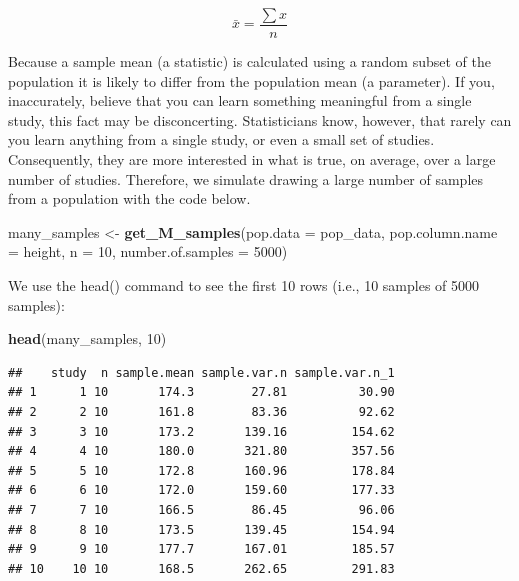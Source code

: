 \documentclass[
]{krantz}
\makeatletter
\newenvironment{Shaded}{\begin{snugshade}}{\end{snugshade}}
\newcommand{\DataTypeTok}[1]{\textcolor[rgb]{0.27,0.27,0.27}{#1}}
\newcommand{\DecValTok}[1]{\textcolor[rgb]{0.06,0.06,0.06}{#1}}
\newcommand{\KeywordTok}[1]{\textcolor[rgb]{0.27,0.27,0.27}{\textbf{#1}}}
\newcommand{\NormalTok}[1]{#1}
\newcommand{\StringTok}[1]{\textcolor[rgb]{0.5,0.5,0.5}{#1}}
\newenvironment{kframe}{%
\medskip{}
\setlength{\fboxsep}{.8em}
 \def\at@end@of@kframe{}%
 \ifinner\ifhmode%
  \def\at@end@of@kframe{\end{minipage}}%
  \begin{minipage}{\columnwidth}%
 \fi\fi%
 \def\FrameCommand##1{\hskip\@totalleftmargin \hskip-\fboxsep
 \colorbox{shadecolor}{##1}\hskip-\fboxsep
     \hskip-\linewidth \hskip-\@totalleftmargin \hskip\columnwidth}%
 \MakeFramed {\advance\hsize-\width
   \@totalleftmargin\z@ \linewidth\hsize
   \@setminipage}}%
 {\par\unskip\endMakeFramed%
 \at@end@of@kframe}
\renewenvironment{Shaded}{\begin{kframe}}{\end{kframe}}
\makeatother
\begin{document}
\begin{equation} 
\bar{x} = \frac{\sum{x}}{n}
      \label{eq:samplemeanch5}
\end{equation}

Because a sample mean (a statistic) is calculated using a random subset of the population it is likely to differ from the population mean (a parameter). If you, inaccurately, believe that you can learn something meaningful from a single study, this fact may be disconcerting. Statisticians know, however, that rarely can you learn anything from a single study, or even a small set of studies. Consequently, they are more interested in what is true, on average, over a large number of studies. Therefore, we simulate drawing a large number of samples from a population with the code below.

\begin{Shaded}
\begin{Highlighting}[]
\NormalTok{many_samples <-}\StringTok{ }\KeywordTok{get_M_samples}\NormalTok{(}\DataTypeTok{pop.data =}\NormalTok{ pop_data, }
                              \DataTypeTok{pop.column.name =}\NormalTok{ height,}
                              \DataTypeTok{n =} \DecValTok{10}\NormalTok{,}
                              \DataTypeTok{number.of.samples =} \DecValTok{5000}\NormalTok{)}
\end{Highlighting}
\end{Shaded}

We use the head() command to see the first 10 rows (i.e., 10 samples of 5000 samples):

\begin{Shaded}
\begin{Highlighting}[]
\KeywordTok{head}\NormalTok{(many_samples, }\DecValTok{10}\NormalTok{)}
\end{Highlighting}
\end{Shaded}

\begin{verbatim}
##    study  n sample.mean sample.var.n sample.var.n_1
## 1      1 10       174.3        27.81          30.90
## 2      2 10       161.8        83.36          92.62
## 3      3 10       173.2       139.16         154.62
## 4      4 10       180.0       321.80         357.56
## 5      5 10       172.8       160.96         178.84
## 6      6 10       172.0       159.60         177.33
## 7      7 10       166.5        86.45          96.06
## 8      8 10       173.5       139.45         154.94
## 9      9 10       177.7       167.01         185.57
## 10    10 10       168.5       262.65         291.83
\end{verbatim}
\end{document}
